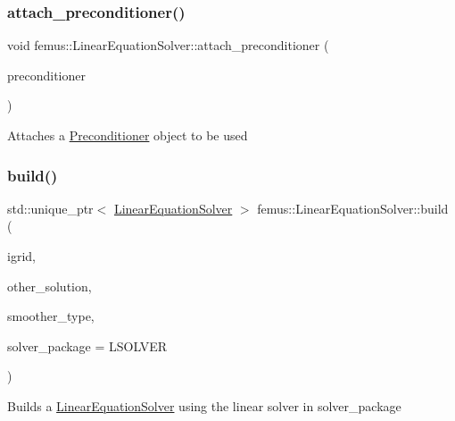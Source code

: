 \subsubsection{\texorpdfstring{attach\+\_\+preconditioner()}{attach\_preconditioner()}}
{\footnotesize\ttfamily void femus\+::\+Linear\+Equation\+Solver\+::attach\+\_\+preconditioner (\begin{DoxyParamCaption}\item[{\mbox{\hyperlink{classfemus_1_1_preconditioner}{Preconditioner}} $\ast$}]{preconditioner }\end{DoxyParamCaption})}

Attaches a \mbox{\hyperlink{classfemus_1_1_preconditioner}{Preconditioner}} object to be used \mbox{\label{classfemus_1_1_linear_equation_solver_a1c5462b2be3a908d75ea73e8ab222216}} 
\subsubsection{\texorpdfstring{build()}{build()}}
{\footnotesize\ttfamily std\+::unique\+\_\+ptr$<$ \mbox{\hyperlink{classfemus_1_1_linear_equation_solver}{Linear\+Equation\+Solver}} $>$ femus\+::\+Linear\+Equation\+Solver\+::build (\begin{DoxyParamCaption}\item[{const unsigned \&}]{igrid,  }\item[{\mbox{\hyperlink{classfemus_1_1_solution}{Solution}} $\ast$}]{other\+\_\+solution,  }\item[{const \mbox{\hyperlink{_mg_smoother_enum_8hpp_a4d11c2ff93e2f0f440c879a9c40cda71}{Mg\+Smoother}} \&}]{smoother\+\_\+type,  }\item[{const \mbox{\hyperlink{_solver_package_enum_8hpp_a32541e934c944770722653e69abe38fe}{Solver\+Package}}}]{solver\+\_\+package = {\ttfamily LSOLVER} }\end{DoxyParamCaption})\hspace{0.3cm}{\ttfamily [static]}}

Builds a {\ttfamily \mbox{\hyperlink{classfemus_1_1_linear_equation_solver}{Linear\+Equation\+Solver}}} using the linear solver in {\ttfamily solver\+\_\+package} \mbox{\label{classfemus_1_1_linear_equation_solver_a81ebc19b503dbfc0620f2ca80c1406fa}} 
